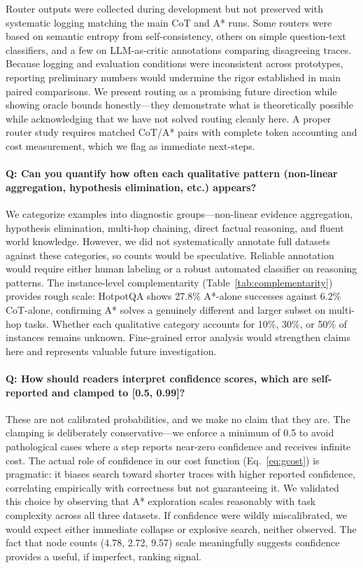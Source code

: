 \documentclass[11pt]{article}
\begin{document}
Router outputs were collected during development but not preserved with systematic logging matching the main CoT and A* runs. Some routers were based on semantic entropy from self-consistency, others on simple question-text classifiers, and a few on LLM-as-critic annotations comparing disagreeing traces. Because logging and evaluation conditions were inconsistent across prototypes, reporting preliminary numbers would undermine the rigor established in main paired comparisons. We present routing as a promising future direction while showing oracle bounds honestly---they demonstrate what is theoretically possible while acknowledging that we have not solved routing cleanly here. A proper router study requires matched CoT/A* pairs with complete token accounting and cost measurement, which we flag as immediate next-steps.

\paragraph{Q: Can you quantify how often each qualitative pattern (non-linear aggregation, hypothesis elimination, etc.) appears?}

We categorize examples into diagnostic groups---non-linear evidence aggregation, hypothesis elimination, multi-hop chaining, direct factual reasoning, and fluent world knowledge. However, we did not systematically annotate full datasets against these categories, so counts would be speculative. Reliable annotation would require either human labeling or a robust automated classifier on reasoning patterns. The instance-level complementarity (Table~\ref{tab:complementarity}) provides rough scale: HotpotQA shows 27.8\% A*-alone successes against 6.2\% CoT-alone, confirming A* solves a genuinely different and larger subset on multi-hop tasks. Whether each qualitative category accounts for 10\%, 30\%, or 50\% of instances remains unknown. Fine-grained error analysis would strengthen claims here and represents valuable future investigation.

\paragraph{Q: How should readers interpret confidence scores, which are self-reported and clamped to [0.5, 0.99]?}

These are not calibrated probabilities, and we make no claim that they are. The clamping is deliberately conservative---we enforce a minimum of 0.5 to avoid pathological cases where a step reports near-zero confidence and receives infinite cost. The actual role of confidence in our cost function (Eq.~\ref{eq:gcost}) is pragmatic: it biases search toward shorter traces with higher reported confidence, correlating empirically with correctness but not guaranteeing it. We validated this choice by observing that A* exploration scales reasonably with task complexity across all three datasets. If confidence were wildly miscalibrated, we would expect either immediate collapse or explosive search, neither observed. The fact that node counts (4.78, 2.72, 9.57) scale meaningfully suggests confidence provides a useful, if imperfect, ranking signal.
\end{document}
